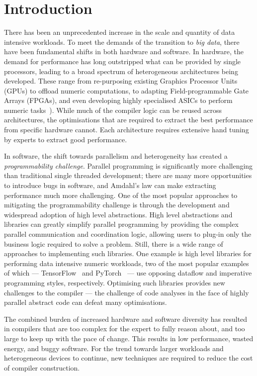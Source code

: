 \chapter{Introduction}

There has been an unprecedented increase in the scale and quantity of data intensive workloads. To meet the demands of the transition to \emph{big data}, there have been fundamental shifts in both hardware and software. In hardware, the demand for performance has long outstripped what can be provided by single processors, leading to a broad spectrum of heterogeneous architectures being developed. These range from re-purposing existing Graphics Processor Units (GPUs) to offload numeric computations, to adapting Field-programmable Gate Arrays (FPGAs), and even developing highly  specialised ASICs to perform numeric tasks~\cite{Jouppi2017}). While much of the compiler logic can be reused across architectures, the optimisations that are required to extract the best performance from specific hardware cannot. Each architecture requires extensive hand tuning by experts to extract good performance.

In software, the shift towards parallelism and heterogeneity has created a \emph{programmability challenge}. Parallel programming is significantly more challenging than traditional single threaded development; there are many more opportunities to introduce bugs in software, and Amdahl's law can make extracting performance much more challenging. One of the most popular approaches to mitigating the programmability challenge is through the development and widespread adoption of high level abstractions. High level abstractions and libraries can greatly simplify parallel programming by providing the complex parallel communication and coordination logic, allowing users to plug-in only the business logic required to solve a problem. Still, there is a wide range of approaches to implementing such libraries. One example is high level libraries for performing data intensive numeric workloads, two of the most popular examples of which --- TensorFlow~\cite{Abadi} and PyTorch~\cite{Paszke2017} --- use opposing dataflow and imperative programming styles, respectively. Optimising such libraries provides new challenges to the compiler --- the challenge of code analyses in the face of highly parallel abstract code can defeat many optimisations.

The combined burden of increased hardware and software diversity has resulted in compilers that are too complex for the expert to fully reason about, and too large to keep up with the pace of change. This results in low performance, wasted energy, and buggy software. For the trend towards larger workloads and heterogeneous devices to continue, new techniques are required to reduce the cost of compiler construction.


